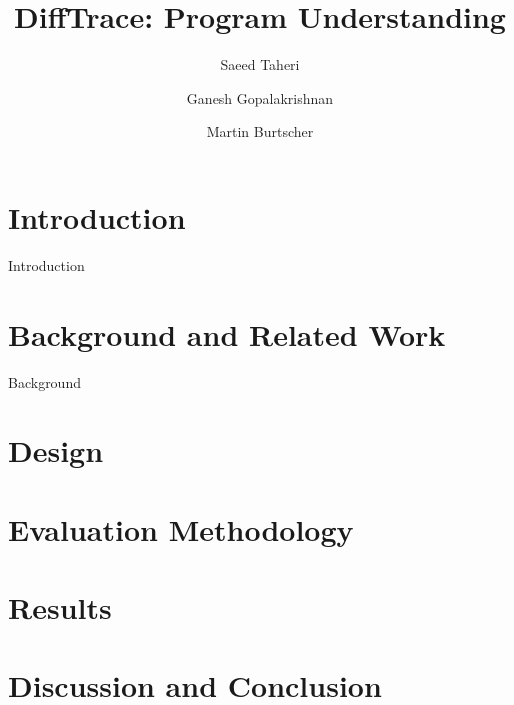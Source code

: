 \documentclass[sigconf,review]{acmart}
\begin{document}
\title{ DiffTrace: Program Understanding}


\author{Saeed Taheri}

\author{Ganesh Gopalakrishnan}

\author{Martin Burtscher}




\begin{abstract}
\label{abs}

\end{abstract}


\maketitle


\section{Introduction}
\label{sec:intro}
Introduction \cite{ilcs}
%


\section{Background and Related Work}
\label{sec:bgreltool}
Background


\section{Design }
\label{sec:design}
%

\section{Evaluation Methodology}
\label{sec:evalmeth}
%

\section{Results}
\label{sec:results}


    

\section{Discussion and Conclusion}
\label{sec:concl}
%




\end{document}
